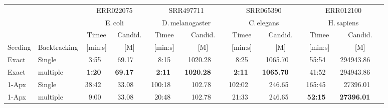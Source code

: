 \begin{tabular}{llrrrrrrrr}
\toprule

  & \multirow{2}{*}{}  &\multicolumn{ 2 }{c}{  ERR022075 } &\multicolumn{ 2 }{c}{  SRR497711 } &\multicolumn{ 2 }{c}{  SRR065390 } &\multicolumn{ 2 }{c}{  ERR012100 } \\
  &&\multicolumn{2}{c}{E.\,coli}&\multicolumn{2}{c}{D.\,melanogaster}&\multicolumn{2}{c}{C.\,elegans}&\multicolumn{2}{c}{H.\,sapiens} \\
  \cmidrule(lr){3-4}\cmidrule(lr){5-6}\cmidrule(lr){7-8}\cmidrule(lr){9-10} 
  
  & &\multicolumn{1}{c}{  Timee } &\multicolumn{1}{c}{  Candid. } &\multicolumn{1}{c}{  Timee } &\multicolumn{1}{c}{  Candid. } &\multicolumn{1}{c}{  Timee } &\multicolumn{1}{c}{  Candid. } &\multicolumn{1}{c}{  Timee } &\multicolumn{1}{c}{  Candid. } \\
  Seeding & Backtracking  &\multicolumn{1}{c}{  [min:s] } &\multicolumn{1}{c}{  [M] } &\multicolumn{1}{c}{  [min:s] } &\multicolumn{1}{c}{  [M] } &\multicolumn{1}{c}{  [min:s] } &\multicolumn{1}{c}{  [M] } &\multicolumn{1}{c}{  [min:s] } &\multicolumn{1}{c}{  [M] } \\

\midrule

Exact  &  Single    & \phantom{000}3:55\ \  & 69.17\ \ \  & \phantom{000}8:15\ \  & 1020.28\ \ \  & \phantom{000}8:25\ \  & 1065.70\ \ \  & \phantom{00}55:54\ \  & 294943.86\ \ \  \\ 
Exact  &  multiple  & \phantom{000}\textbf{1:20}\ \  & \textbf{69.17}\ \ \  & \phantom{000}\textbf{2:11}\ \  & \textbf{1020.28}\ \ \  & \phantom{000}\textbf{2:11}\ \  & \textbf{1065.70}\ \ \  & \phantom{00}41:52\ \  & 294943.86\ \ \  \\

\midrule

1-Apx &  Single     & \phantom{00}38:42\ \  & 33.08\ \ \  & \phantom{0}100:18\ \  & 102.78\ \ \  & \phantom{0}102:02\ \  & 246.65\ \ \  & \phantom{0}165:45\ \  & 27396.01\ \ \  \\ 
1-Apx &  multiple   & \phantom{00}9:00\ \  & 33.08\ \ \  & \phantom{00}20:48\ \  & 102.78\ \ \  & \phantom{00}21:33\ \  & 246.65\ \ \  & \phantom{00}\textbf{52:15}\ \  & \textbf{27396.01}\ \ \  \\ 
\bottomrule
\end{tabular}
